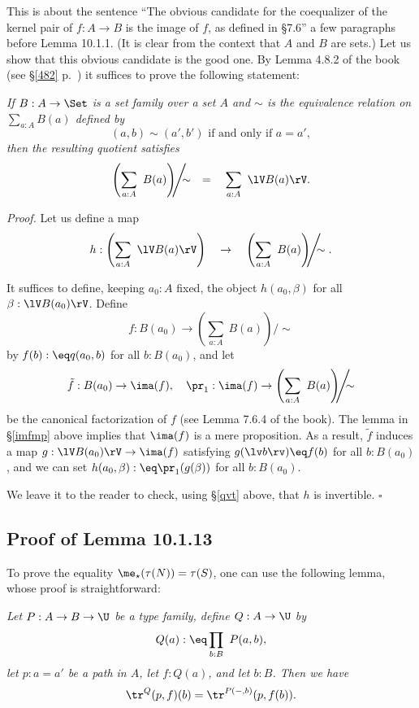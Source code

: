 \documentclass[12pt]{article}
\begin{document}
This is about the sentence ``The obvious candidate for the coequalizer of the kernel pair of $f:A\to B$ is the image of $f$, as defined in \S7.6'' a few paragraphs before Lemma 10.1.1. (It is clear from the context that $A$ and $B$ are sets.) Let us show that this obvious candidate is the good one. By Lemma 4.8.2 of the book (see \S\ref{482} p.~\pageref{482}) it suffices to prove the following statement:

\emph{If $B:A\to\Set$ is a set family over a set $A$ and $\sim$ is the equivalence relation on $\sum_{a:A}B(a)$ defined by 
$$
(a,b)\sim(a',b')\text{ if and only if }a=a',
$$ 
then the resulting quotient satisfies}
$$
\left(\sum_{a:A}\ B(a)\right)\!\!\!\Bigg/\!\!\!\!\sim\quad=\quad\sum_{a:A}\ \lV B(a)\rV.
$$

\nn\emph{Proof.} Let us define a map 
$$
h:\left(\sum_{a:A}\ \lV B(a)\rV\right)\quad\to\quad\left(\sum_{a:A}\ B(a)\right)\!\!\!\Bigg/\!\!\!\!\sim.
$$ 

It suffices to define, keeping $a_0:A$ fixed, the object $h(a_0,\beta)$ for all $\beta:\lV B(a_0)\rV$. Define 
$$
f:B(a_0)\to\left(\sum_{a:A}\ B(a)\right)\!\!\!\Bigg/\!\!\!\!\sim
$$ 
by $f(b):\eq q(a_0,b)$ for all $b:B(a_0)$, and let 
$$
\tilde f:B(a_0)\to\ima(f),\quad\pr_1:\ima(f)\to\left(\sum_{a:A}\ B(a)\right)\!\!\!\Bigg/\!\!\!\!\sim
$$ 
be the canonical factorization of $f$ (see Lemma 7.6.4 of the book). The lemma in \S\ref{imfmp} above implies that $\ima(f)$ is a mere proposition. As a result, $\tilde f$ induces a map $g:\lV B(a_0)\rV\to\ima(f)$ satisfying $g(\lv b\rv)\eq f(b)$ for all $b:B(a_0)$, and we can set $h(a_0,\beta):\eq\pr_1(g(\beta))$ for all $b:B(a_0)$.

We leave it to the reader to check, using \S\ref{qvt} above, that $h$ is invertible. $\square$


\subsection{Proof of Lemma 10.1.13}

To prove the equality $\me_\star(\tau(N))=\tau(S)$, one can use the following lemma, whose proof is straightforward:

\nn{} \emph{Let $P:A\to B\to\U$ be a type family, define $Q:A\to\U$ by 
$$
Q(a):\eq\prod_{b:B}\ P(a,b),
$$ 
let $p:a=a'$ be a path in $A$, let $f:Q(a)$, and let $b:B$. Then we have} 
$$
\tr^Q(p,f)(b)=\tr^{P(-,b)}(p,f(b)).
$$

\end{document}
